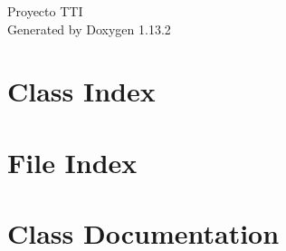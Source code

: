 \documentclass[twoside]{book}
\newcommand{\+}{\discretionary{\mbox{\scriptsize$\hookleftarrow$}}{}{}}
\newcommand{\clearemptydoublepage}{%
    \newpage{\pagestyle{empty}\cleardoublepage}%
  }
\begin{document}
  \raggedbottom
    \hypersetup{pageanchor=false,
                bookmarksnumbered=true,
                pdfencoding=unicode
               }
  \begin{titlepage}
  \vspace*{7cm}
  \begin{center}%
  {\Large Proyecto TTI}\\
  \vspace*{1cm}
  {\large Generated by Doxygen 1.13.2}\\
  \end{center}
  \end{titlepage}
  \clearemptydoublepage
  \tableofcontents
  \clearemptydoublepage
  \hypersetup{pageanchor=true}

\chapter{Class Index}

\chapter{File Index}

\chapter{Class Documentation}



\end{document}
